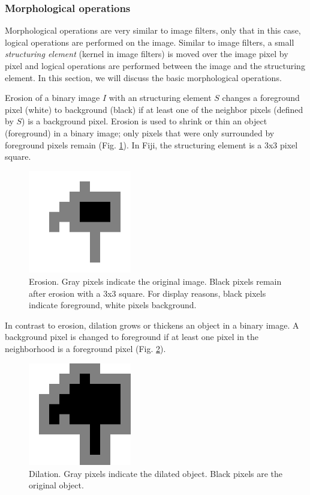 \subsubsection{Morphological operations}
Morphological operations are very similar to image filters, only that in this case, logical operations are performed on the image. Similar to image filters, a small \emph{structuring element} (kernel in image filters) is moved over the image pixel by pixel and logical operations are performed between the image and the structuring element. In this section, we will discuss the basic morphological operations.

Erosion of a binary image $I$ with an structuring element $S$ changes a foreground pixel (white) to background (black) if at least one of the neighbor pixels (defined by $S$) is a background pixel. Erosion is used to shrink or thin an object (foreground) in a binary image; only pixels that were only surrounded by foreground pixels remain (Fig. \ref{fig:morphology-erosion}). In Fiji, the structuring element is a 3x3 pixel square. 

\begin{figure}[!ht]
	\centering
		\includegraphics[width=0.40\textwidth]{mod3/figures/morphology-erosion.png}
	\caption{Erosion. Gray pixels indicate the original image. Black pixels remain after erosion with a 3x3 square. For display reasons, black pixels indicate foreground, white pixels background.}
	\label{fig:morphology-erosion}
\end{figure}

In contrast to erosion, dilation grows or thickens an object in a binary image. A background pixel is changed to foreground if at least one pixel in the neighborhood is a foreground pixel (Fig. \ref{fig:morphology-dilation}). 

\begin{figure}[!ht]
	\centering
		\includegraphics[width=0.40\textwidth]{mod3/figures/morphology-dilation.png}
	\caption{Dilation. Gray pixels indicate the dilated object. Black pixels are the original object.}
	\label{fig:morphology-dilation}
\end{figure}

